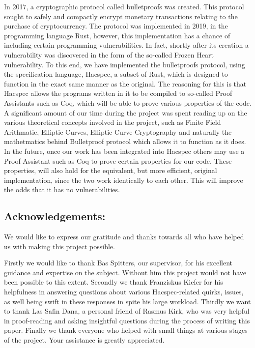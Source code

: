 \documentclass{article}
\begin{document}
In 2017, a cryptographic protocol called bulletproofs was created. This protocol sought to safely and compactly encrypt monetary transactions relating to the purchase of cryptocurrency. The protocol was implemented in 2019, in the programming language Rust, however, this implementation has a chance of including certain programming vulnerabilities. In fact, shortly after its creation a vulnerability was discovered in the form of the so-called Frozen Heart vulnerability. To this end, we have implemented the bulletproofs protocol, using the specification language, Hacspec, a subset of Rust, which is designed to function in the exact same manner as the original. The reasoning for this is that Hacspec allows the programs written in it to be compiled to so-called Proof Assistants such as Coq, which will be able to prove various properties of the code. A significant amount of our time during the project was spent reading up on the various theoretical concepts involved in the project, such as Finite Field Arithmatic, Elliptic Curves, Elliptic Curve Cryptography and naturally the mathetmatics behind Bulletproof protocol which allows it to function as it does. In the future, once our work has been integrated into Hacspec others may use a Proof Assistant such as Coq to prove certain properties for our code. These properties, will also hold for the equivalent, but more efficient, original implementation, since the two work identically to each other. This will improve the odds that it has no vulnerabilities.

\subsection*{Acknowledgements:}

We would like to express our gratitude and thanks towards all who have helped us with making this project possible.

Firstly we would like to thank Bas Spitters, our supervisor, for his excellent guidance and expertise on the subject. Without him this project would not have been possible to this extent. Secondly we thank Franziskus Kiefer for his helpfulness in answering questions about various Hacspec-related quirks, issues, as well being swift in these responses in spite his large workload. Thirdly we want to thank Las Safin Dana, a personal friend of Rasmus Kirk, who was very helpful in proof-reading and asking insightful questions during the process of writing this paper. Finally we thank everyone who helped with small things at various stages of the project. Your assistance is greatly appreciated. 
\end{document}

